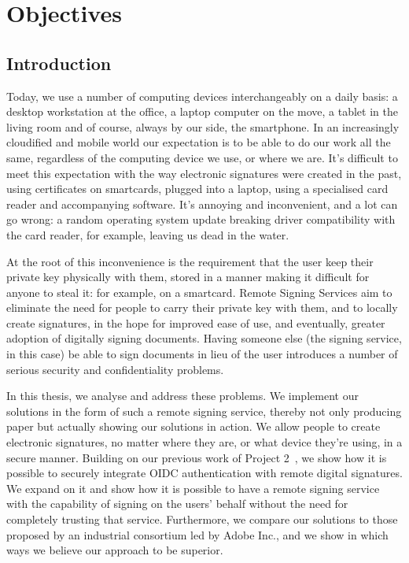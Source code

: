 \chapter{Objectives}
\label{ch:objectives}


\section{Introduction}
\label{sec:introduction}

Today, we use a number of computing devices interchangeably on a daily basis: a desktop workstation at the office,
a laptop computer on the move, a tablet in the living room and of course, always by our side, the smartphone.
In an increasingly cloudified and mobile world our expectation is to be able to do our work all the same,
regardless of the computing device we use, or where we are.
It's difficult to meet this expectation with the way electronic signatures were created in the past,
using certificates on smartcards, plugged into a laptop, using a specialised card reader and accompanying software.
It's annoying and inconvenient, and a lot can go wrong:
a random operating system update breaking driver compatibility with the card reader, for example,
leaving us dead in the water.


At the root of this inconvenience is the requirement that the user keep their private key physically with them,
stored in a manner making it difficult for anyone to steal it: for example, on a smartcard.
Remote Signing Services aim to eliminate the need for people to carry their private key with them,
and to locally create signatures,
in the hope for improved ease of use, and eventually, greater adoption of digitally signing documents.
Having someone else (the signing service, in this case) be able to sign documents in lieu of the user introduces a number of serious security and confidentiality problems.


In this thesis, we analyse and address these problems.
We implement our solutions in the form of such a remote signing service,
thereby not only producing paper but actually showing our solutions in action.
We allow people to create electronic signatures,
no matter where they are, or what device they're using,
in a secure manner.
Building on our previous work of Project 2~\cite{projekt2}, we show how it is possible to securely integrate \gls{OIDC} authentication with remote digital signatures.
We expand on it and show how it is possible to have a remote signing service with the capability of signing on the users' behalf without the need for completely trusting that service.
Furthermore, we compare our solutions to those proposed by an industrial consortium led by Adobe Inc.,
and we show in which ways we believe our approach to be superior.

